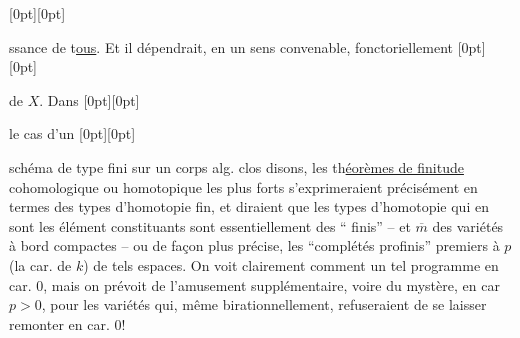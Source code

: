 \raisebox{0pt}[0pt][0pt]{\parbox{0pt}{}}%
ssance de
t\uline{ous}. Et il dépendrait, en un sens convenable,
fonctoriellement%
\raisebox{0pt}[0pt][0pt]{\parbox{0pt}{}}
de $X$. Dans%
\raisebox{0pt}[0pt][0pt]{\parbox{0pt}{}}
le cas d'un%
\raisebox{0pt}[0pt][0pt]{\parbox{0pt}{}}
schéma de type fini sur un corps alg. clos disons, les
th\uline{éorèmes de finitude} cohomologique ou homotopique les plus forts s'exprimeraient précisément en termes des types d'homotopie fin, et diraient que les types d'homotopie  qui en sont les élément constituants sont essentiellement des `` finis'' -- et $\overline{m}$ des variétés à bord compactes -- ou de façon plus précise,
%
les ``complétés profinis''  premiers à $p$ (la car. de $k$) de tels espaces.
On voit clairement comment  un tel programme en car. $0$, mais on prévoit de l'amusement supplémentaire, voire du mystère, en car $p>0$, pour les variétés qui, même birationnellement, refuseraient de se laisser remonter en car. $0$!


